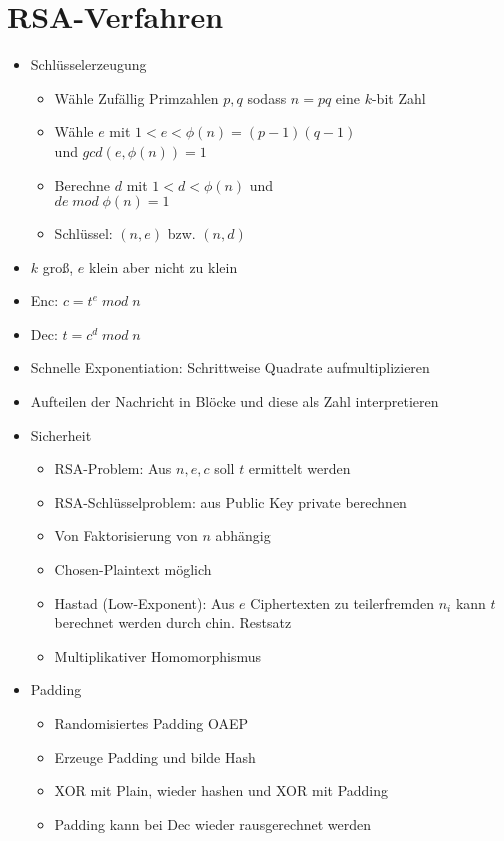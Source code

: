 \documentclass[11pt, paper=a4, twocolumn]{scrartcl}
\begin{document}
	\section{RSA-Verfahren}
		\begin{itemize}
			\item Schlüsselerzeugung
				\begin{itemize}
					\item Wähle Zufällig Primzahlen $p,q$ sodass $n=pq$ eine $k$-bit Zahl
					\item Wähle $e$ mit $1<e<\phi (n)=(p-1)(q-1)$\\
						und $gcd(e,\phi (n))=1$
					\item Berechne $d$ mit $1<d<\phi (n)$ und\\
						$de\;mod\;\phi (n)=1$
					\item Schlüssel: $(n,e)$ bzw. $(n,d)$
				\end{itemize}
			\item $k$ groß, $e$ klein aber nicht zu klein
			\item Enc: $c=t^e\;mod\;n$
			\item Dec: $t=c^d\;mod\;n$
			\item Schnelle Exponentiation: Schrittweise Quadrate aufmultiplizieren
			\item Aufteilen der Nachricht in Blöcke und diese als Zahl interpretieren
			\item Sicherheit
				\begin{itemize}
					\item RSA-Problem: Aus $n,e,c$ soll $t$ ermittelt werden
					\item RSA-Schlüsselproblem: aus Public Key private berechnen
					\item Von Faktorisierung von $n$ abhängig
					\item Chosen-Plaintext möglich
					\item Hastad (Low-Exponent): Aus $e$ Ciphertexten zu teilerfremden $n_i$ kann $t$ berechnet werden durch chin. Restsatz
					\item Multiplikativer Homomorphismus
				\end{itemize}
			\item Padding
				\begin{itemize}
					\item Randomisiertes Padding OAEP
					\item Erzeuge Padding und bilde Hash
					\item XOR mit Plain, wieder hashen und XOR mit Padding
					\item Padding kann bei Dec wieder rausgerechnet werden
				\end{itemize}
		\end{itemize}
	
\end{document}
